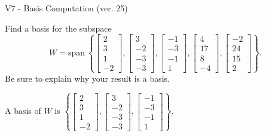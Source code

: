 \begin{exercise}
  \begin{exerciseTitle}V7 - Basis Computation (ver. 25)\end{exerciseTitle}
  \begin{exerciseStatement}
    Find a basis for the subspace 
\[W=\mathrm{span}\ \left\{\left[\begin{array}{r}
2 \\
3 \\
1 \\
-2
\end{array}\right] , \left[\begin{array}{r}
3 \\
-2 \\
-3 \\
-3
\end{array}\right] , \left[\begin{array}{r}
-1 \\
-3 \\
-1 \\
1
\end{array}\right] , \left[\begin{array}{r}
4 \\
17 \\
8 \\
-4
\end{array}\right] , \left[\begin{array}{r}
-2 \\
24 \\
15 \\
2
\end{array}\right]\right\}.\]
 Be sure to explain why your result is a basis.


  \end{exerciseStatement}
  \begin{exerciseAnswer}
   A basis of \(W\) is  \(\left\{\left[\begin{array}{r}
2 \\
3 \\
1 \\
-2
\end{array}\right] , \left[\begin{array}{r}
3 \\
-2 \\
-3 \\
-3
\end{array}\right] , \left[\begin{array}{r}
-1 \\
-3 \\
-1 \\
1
\end{array}\right]\right\}\).
  


  \end{exerciseAnswer}
\end{exercise}